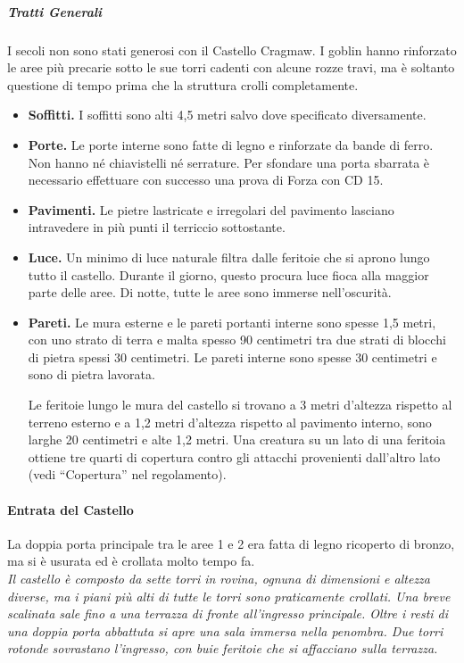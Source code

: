 \documentclass{article}
\begin{document}
\subparagraph{Tratti Generali}
I secoli non sono stati generosi con il Castello Cragmaw. I
goblin hanno rinforzato le aree più precarie sotto le sue torri
cadenti con alcune rozze travi, ma è soltanto questione di
tempo prima che la struttura crolli completamente.
\begin{itemize}
    \item \textbf{Soffitti.} I soffitti sono alti 4,5 metri salvo dove specificato diversamente.
    \item \textbf{Porte.} Le porte interne sono fatte di legno e rinforzate da bande di ferro. Non hanno né chiavistelli né serrature. Per sfondare una porta sbarrata è necessario effettuare con successo una prova di Forza con CD 15.
    \item \textbf{Pavimenti.} Le pietre lastricate e irregolari del pavimento lasciano intravedere in più punti il terriccio sottostante.
    \item \textbf{Luce.} Un minimo di luce naturale filtra dalle feritoie che si aprono lungo tutto il castello. Durante il giorno, questo procura luce fioca alla maggior parte delle aree. Di notte, tutte le aree sono immerse nell'oscurità.
    \item \textbf{Pareti.} Le mura esterne e le pareti portanti interne sono spesse 1,5 metri, con uno strato di terra e malta spesso 90 centimetri tra due strati di blocchi di pietra spessi 30 centimetri. Le pareti interne sono spesse 30 centimetri e sono di pietra lavorata.
    
    Le feritoie lungo le mura del castello si trovano a 3 metri d’altezza rispetto al terreno esterno e a 1,2 metri d'altezza rispetto al pavimento interno, sono larghe 20 centimetri e alte 1,2 metri. Una creatura su un lato di una feritoia ottiene tre quarti di copertura contro gli attacchi provenienti dall’altro lato (vedi “Copertura” nel regolamento).
\end{itemize}

\paragraph{Entrata del Castello}
La doppia porta principale tra le aree 1 e 2 era fatta di
legno ricoperto di bronzo, ma si è usurata ed è crollata
molto tempo fa. \\

\textit{Il castello è composto da sette torri in rovina, ognuna di
dimensioni e altezza diverse, ma i piani più alti di tutte le torri
sono praticamente crollati. Una breve scalinata sale fino a
una terrazza di fronte all'ingresso principale. Oltre i resti di
una doppia porta abbattuta si apre una sala immersa nella
penombra. Due torri rotonde sovrastano l'ingresso, con buie
feritoie che si affacciano sulla terrazza.}\\
\end{document}
